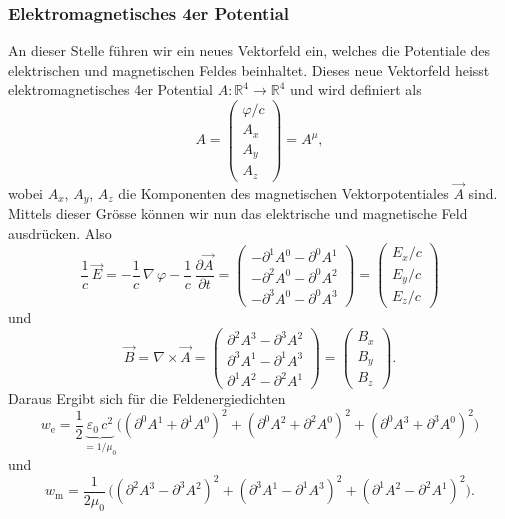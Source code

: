 \subsubsection{Elektromagnetisches 4er Potential}
An dieser Stelle führen wir ein neues Vektorfeld ein, welches die Potentiale des elektrischen und magnetischen Feldes beinhaltet.
Dieses neue Vektorfeld heisst elektromagnetisches 4er Potential
\(
A:\mathbb{R}^4 \rightarrow \mathbb{R}^4
\)
und wird definiert als
\begin{equation}
	A
	=
	\begin{pmatrix}
		\varphi / c\\
		A_x\\
		A_y\\
		A_z
	\end{pmatrix}
	=
	A^{\mu},
\end{equation}
wobei $A_x$, $A_y$, $A_z$ die Komponenten des magnetischen Vektorpotentiales $\vec{A}$ sind.
Mittels dieser Grösse können wir nun das elektrische und magnetische Feld ausdrücken.
Also
\begin{equation}
\frac{1}{c}\, \vec{E}
=
-\frac{1}{c}\, \nabla\,\varphi - \frac{1}{c}\,\frac{\partial \vec{A}}{\partial t}
=
\begin{pmatrix}
	-\partial^1 A^0 - \partial^0 A^1\\
	-\partial^2 A^0 - \partial^0 A^2\\
	-\partial^3 A^0 - \partial^0 A^3
\end{pmatrix}
=
\begin{pmatrix}
	E_x / c\\
	E_y / c\\
	E_z / c
\end{pmatrix}
\end{equation}
und
\begin{equation}
\vec{B}
=
\nabla \times \vec{A}
=
\begin{pmatrix}
	\partial^2 A^3 - \partial^3 A^2\\
	\partial^3 A^1 - \partial^1 A^3\\
	\partial^1 A^2 - \partial^2 A^1
\end{pmatrix}
=
\begin{pmatrix}
	B_x\\
	B_y\\
	B_z
\end{pmatrix}.
\end{equation}
Daraus Ergibt sich für die Feldenergiedichten
\[
w_{\text{e}}
=
\frac{1}{2}\underbrace{\varepsilon_0\,c^2}_{\displaystyle=1/\mu_0} \biggl(\left(\partial^0 A^1 + \partial^1 A^0\right)^2 + \left(\partial^0 A^2 + \partial^2 A^0\right)^2 + 
\left(\partial^0 A^3 + \partial^3 A^0\right)^2\biggr)
\]
und 
\[
w_{\text{m}}
=
\frac{1}{2\mu_0}\,\biggl(\left(\partial^2 A^3 - \partial^3 A^2\right)^2 + \left(\partial^3 A^1 - \partial^1 A^3\right)^2 + 
\left(\partial^1 A^2 - \partial^2 A^1\right)^2\biggr).
\]

